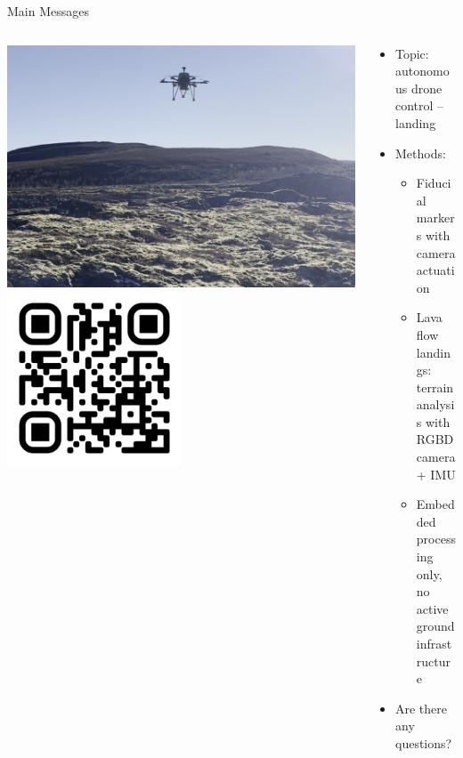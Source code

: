 \documentclass[aspectratio=169]{beamer}
\begin{document}
\begin{frame}{Main Messages}
\begin{columns}
	\begin{column}{0.4\textwidth}
		\centering
		\includegraphics[width=\textwidth]{./images/depth_drone_flying}
		\vfill
		\includegraphics[width=0.5\textwidth]{./images/qr_uzgit_github_io.png}
	\end{column}
	\begin{column}{0.6\textwidth}
	\begin{itemize}
		\item Topic: autonomous drone control -- landing
		\item Methods:
		\begin{itemize}
			\item Fiducial markers with camera actuation
			\item Lava flow landings: terrain analysis with RGBD camera + IMU
			\item Embedded processing only, no active ground infrastructure
		\end{itemize}
	\item Are there any questions?
	\end{itemize}
	\end{column}
\end{columns}
\end{frame}

%	
%	
\end{document}
